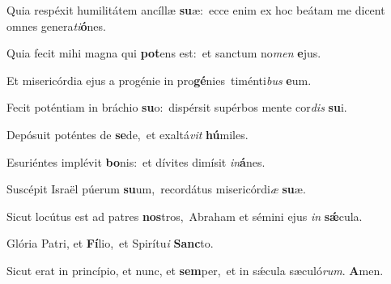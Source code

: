 Quia respéxit humilitátem ancíllæ \textbf{su}æ:~\redgreheightstar ecce enim ex hoc beátam me dicent omnes genera\textit{ti}\textbf{ó}nes.

Quia fecit mihi magna qui \textbf{pot}ens est:~\redgreheightstar et sanctum no\textit{men} \textbf{e}jus.

Et misericórdia ejus a progénie in pro\textbf{gé}nies~\redgreheightstar timénti\textit{bus} \textbf{e}um.

Fecit poténtiam in bráchio \textbf{su}o:~\redgreheightstar dispérsit supérbos mente cor\textit{dis} \textbf{su}i.

Depósuit poténtes de \textbf{se}de,~\redgreheightstar et exaltá\textit{vit} \textbf{hú}miles.

Esuriéntes implévit \textbf{bo}nis:~\redgreheightstar et dívites dimísit \textit{in}\textbf{á}nes.

Suscépit Israël púerum \textbf{su}um,~\redgreheightstar recordátus misericórdi\textit{æ} \textbf{su}æ.

Sicut locútus est ad patres \textbf{nos}tros,~\redgreheightstar Abraham et sémini ejus \textit{in} \textbf{sǽ}cula.

Glória Patri, et \textbf{Fí}lio,~\redgreheightstar et Spirítu\textit{i} \textbf{Sanc}to.

Sicut erat in princípio, et nunc, et \textbf{sem}per,~\redgreheightstar et in sǽcula sæculó\textit{rum}. \textbf{A}men.
